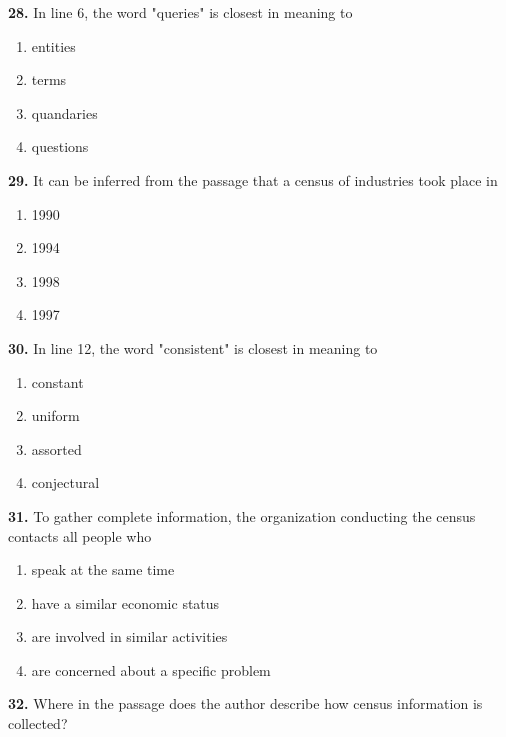 \documentclass[12pt]{article}
\begin{document}
\par
\vspace{0.25\baselineskip}
\noindent\textbf{28.} In line 6, the word "queries" is closest in meaning to
\begin{enumerate}[label=(\Alph*),leftmargin=*,itemsep=0.2em]
\item entities
\item terms
\item quandaries
\item questions
\end{enumerate}
\par
\vspace{0.25\baselineskip}
\noindent\textbf{29.} It can be inferred from the passage that a census of industries took place in
\begin{enumerate}[label=(\Alph*),leftmargin=*,itemsep=0.2em]
\item 1990
\item 1994
\item 1998
\item 1997
\end{enumerate}
\par
\vspace{0.25\baselineskip}
\noindent\textbf{30.} In line 12, the word "consistent" is closest in meaning to
\begin{enumerate}[label=(\Alph*),leftmargin=*,itemsep=0.2em]
\item constant
\item uniform
\item assorted
\item conjectural
\end{enumerate}
\par
\vspace{0.25\baselineskip}
\noindent\textbf{31.} To gather complete information, the organization conducting the census contacts all people who
\begin{enumerate}[label=(\Alph*),leftmargin=*,itemsep=0.2em]
\item speak at the same time
\item have a similar economic status
\item are involved in similar activities
\item are concerned about a specific problem
\end{enumerate}
\par
\vspace{0.25\baselineskip}
\noindent\textbf{32.} Where in the passage does the author describe how census information is collected?
\end{document}
